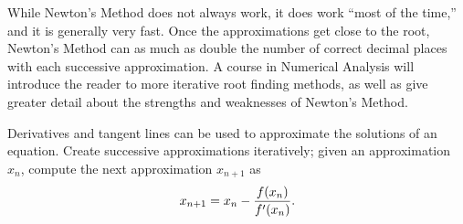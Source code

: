 While Newton's Method does not always work, it does work ``most of the time,'' and it is generally very fast. Once the approximations get close to the root, Newton's Method can as much as double the number of correct decimal places with each successive approximation. A course in Numerical Analysis will introduce the reader to more iterative root finding methods, as well as give greater detail about the strengths and weaknesses of Newton's Method.

\begin{summary} %
\item Derivatives and tangent lines can be used to approximate the solutions of an equation.  Create successive approximations iteratively; given an approximation $x_n$, compute the next approximation $x_{n+1}$ as $$x_{n+1} = x_n - \frac{f(x_n)}{f'(x_n)}.$$
\end{summary}

\clearpage

 

\cleardoublepage